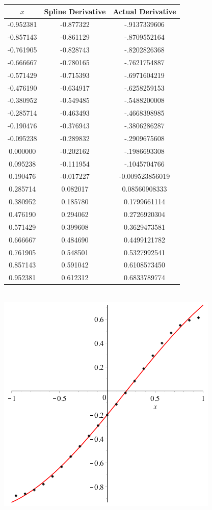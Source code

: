 \documentclass[11pt]{article} %
\begin{document}
\renewcommand{\arraystretch}{1.3} %
\begin{tabular}{| c | c c |}
\hline
$x$ & Spline Derivative & Actual Derivative \\
\hline
-0.952381 & -0.877322 &-.9137339606   \\
-0.857143 &-0.861129  & -.8709552164  \\
-0.761905 & -0.828743 & -.8202826368   \\
-0.666667 &-0.780165 & -.7621754887   \\
-0.571429 &  -0.715393& -.6971604219   \\
-0.476190 &	-0.634917 & -.6258259153   \\
-0.380952 &-0.549485  & -.5488200008   \\
-0.285714 &-0.463493 & -.4668398985   \\
-0.190476 &-0.376943 & -.3806286287 \\
-0.095238 &-0.289832 & -.2909675608   \\
0.000000 & -0.202162 & -.1986693308  \\
0.095238 & -0.111954  & -.1045704766 \\
0.190476 & -0.017227 &  -0.009523856019   \\
0.285714 & 0.082017& 0.08560908333   \\
0.380952 & 0.185780 & 0.1799661114   \\
0.476190 & 0.294062 & 0.2726920304   \\
0.571429 & 0.399608 & 0.3629473581   \\
0.666667 &  0.484690& 0.4499121782   \\
0.761905 & 	0.548501 & 0.5327992541  \\
0.857143 & 0.591042 &0.6108573450   \\
0.952381 &0.612312 & 0.6833789774   \\

\hline
\end{tabular} \\

\includegraphics[scale=1]{plots/deriv1plot.png}
\newpage
\end{document}
